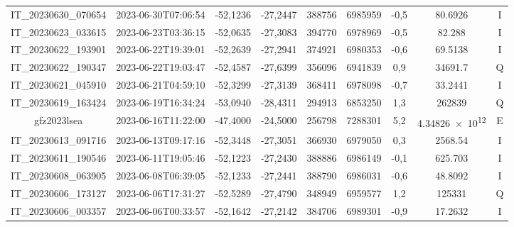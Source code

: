 \begin{center}
\begin{longtable}{ccccS[table-format=6.0]S[table-format=7.0]ccc}
\endlastfoot
IT\_20230630\_070654 & 2023-06-30T07:06:54 & -52,1236 & -27,2447 & 388756 & 6985959 & -0,5 & \num[round-precision=3,round-mode=figures,scientific-notation=true]{80.6926} & I \\
IT\_20230623\_033615 & 2023-06-23T03:36:15 & -52,0635 & -27,3083 & 394770 & 6978969 & -0,5 & \num[round-precision=3,round-mode=figures,scientific-notation=true]{82.288} & I \\
IT\_20230622\_193901 & 2023-06-22T19:39:01 & -52,2639 & -27,2941 & 374921 & 6980353 & -0,6 & \num[round-precision=3,round-mode=figures,scientific-notation=true]{69.5138} & I \\
IT\_20230622\_190347 & 2023-06-22T19:03:47 & -52,4587 & -27,6399 & 356096 & 6941839 & 0,9 & \num[round-precision=3,round-mode=figures,scientific-notation=true]{34691.7} & Q \\
IT\_20230621\_045910 & 2023-06-21T04:59:10 & -52,3299 & -27,3139 & 368411 & 6978098 & -0,7 & \num[round-precision=3,round-mode=figures,scientific-notation=true]{33.2441} & I \\
IT\_20230619\_163424 & 2023-06-19T16:34:24 & -53,0940 & -28,4311 & 294913 & 6853250 & 1,3 & \num[round-precision=3,round-mode=figures,scientific-notation=true]{262839} & Q \\
gfz2023lsea & 2023-06-16T11:22:00 & -47,4000 & -24,5000 & 256798 & 7288301 & 5,2 & \num[round-precision=3,round-mode=figures,scientific-notation=true]{4.34826e+12} & E \\
IT\_20230613\_091716 & 2023-06-13T09:17:16 & -52,3448 & -27,3051 & 366930 & 6979050 & 0,3 & \num[round-precision=3,round-mode=figures,scientific-notation=true]{2568.54} & I \\
IT\_20230611\_190546 & 2023-06-11T19:05:46 & -52,1223 & -27,2430 & 388886 & 6986149 & -0,1 & \num[round-precision=3,round-mode=figures,scientific-notation=true]{625.703} & I \\
IT\_20230608\_063905 & 2023-06-08T06:39:05 & -52,1233 & -27,2441 & 388790 & 6986031 & -0,6 & \num[round-precision=3,round-mode=figures,scientific-notation=true]{48.8092} & I \\
IT\_20230606\_173127 & 2023-06-06T17:31:27 & -52,5289 & -27,4790 & 348949 & 6959577 & 1,2 & \num[round-precision=3,round-mode=figures,scientific-notation=true]{125331} & Q \\
IT\_20230606\_003357 & 2023-06-06T00:33:57 & -52,1642 & -27,2142 & 384706 & 6989301 & -0,9 & \num[round-precision=3,round-mode=figures,scientific-notation=true]{17.2632} & I \\

\end{longtable}
\end{center}
